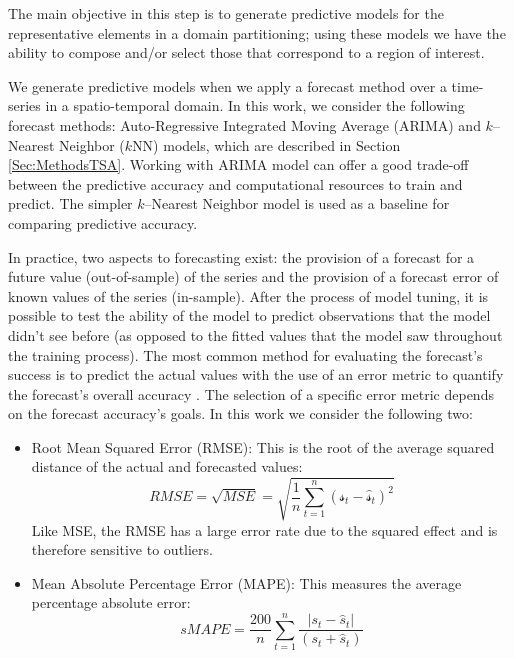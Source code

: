 The main objective in this step is to generate predictive models for the representative elements in a domain partitioning; using these models we have the ability to compose and/or select those that correspond to a region of interest. 

We generate predictive models when we apply a forecast method over a time-series in a spatio-temporal domain. In this work, we consider the following forecast methods: Auto-Regressive Integrated Moving Average (ARIMA) and $k$--Nearest Neighbor ($k$NN) models, which are described in Section \ref{Sec:MethodsTSA}. Working with ARIMA model can offer a good trade-off between the predictive accuracy and computational resources to train and predict. The simpler $k$--Nearest Neighbor model is used as a baseline for comparing predictive accuracy.

In practice, two aspects to forecasting exist: the provision of a forecast for a future value (out-of-sample) of the series and the provision of a forecast error of known values of the series (in-sample). After the process of model tuning, it is possible to test the ability of the model to predict observations that the model didn't see before (as opposed to the fitted values that the model saw throughout the training process). The most common method for evaluating the forecast's success is to predict the actual values with the use of an error metric to quantify the forecast's overall accuracy \cite{Hyndman2006}. The selection of a specific error metric depends on the forecast accuracy's goals. In this work we consider the following two:

\begin{itemize}
	\item Root Mean Squared Error (RMSE): This is the root of the average squared distance of the actual and forecasted values:
	\begin{equation}
	RMSE = \sqrt{MSE} = \sqrt{\frac{1}{n} \sum_{t=1}^{n} \left(\mathcal{s}_{t} - \mathcal{\hat{s}}_t\right)^{2}}
	\end{equation}
	Like MSE, the RMSE has a large error rate due to the squared effect and is therefore sensitive to outliers.
	\item Mean Absolute Percentage Error (MAPE): This measures the average percentage
	absolute error:
	\begin{equation}
	sMAPE = \frac{200}{n}\sum_{t=1}^{n} \frac{\left|s_t - \hat{s}_t\right|}{\left(s_{t}+\hat{s}_{t}\right)}
	\end{equation}	
\end{itemize}

